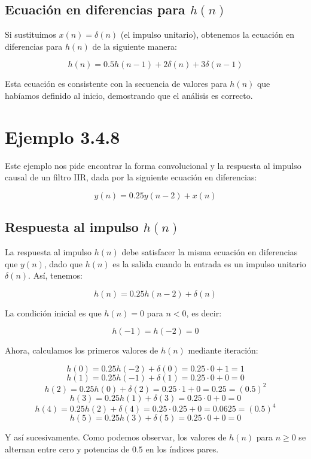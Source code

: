 \documentclass[10pt]{article}
\theoremstyle{definition}
\theoremstyle{remark}
\theoremstyle{definition}
\numberwithin{equation}{prob}
\begin{document}
\subsection*{Ecuación en diferencias para \( h(n) \)}

Si sustituimos \( x(n) = \delta(n) \) (el impulso unitario), obtenemos la ecuación en diferencias para \( h(n) \) de la siguiente manera:

\[
h(n) = 0.5 h(n-1) + 2\delta(n) + 3\delta(n-1)
\]

Esta ecuación es consistente con la secuencia de valores para \( h(n) \) que habíamos definido al inicio, demostrando que el análisis es correcto.


\section*{Ejemplo 3.4.8}

Este ejemplo nos pide encontrar la forma convolucional y la respuesta al impulso causal de un filtro IIR, dada por la siguiente ecuación en diferencias:

\[
y(n) = 0.25y(n-2) + x(n)
\]

\subsection*{Respuesta al impulso \( h(n) \)}

La respuesta al impulso \( h(n) \) debe satisfacer la misma ecuación en diferencias que \( y(n) \), dado que \( h(n) \) es la salida cuando la entrada es un impulso unitario \( \delta(n) \). Así, tenemos:

\[
h(n) = 0.25h(n-2) + \delta(n)
\]

La condición inicial es que \( h(n) = 0 \) para \( n < 0 \), es decir:

\[
h(-1) = h(-2) = 0
\]

Ahora, calculamos los primeros valores de \( h(n) \) mediante iteración:

\[
h(0) = 0.25h(-2) + \delta(0) = 0.25 \cdot 0 + 1 = 1
\]
\[
h(1) = 0.25h(-1) + \delta(1) = 0.25 \cdot 0 + 0 = 0
\]
\[
h(2) = 0.25h(0) + \delta(2) = 0.25 \cdot 1 + 0 = 0.25 = (0.5)^2
\]
\[
h(3) = 0.25h(1) + \delta(3) = 0.25 \cdot 0 + 0 = 0
\]
\[
h(4) = 0.25h(2) + \delta(4) = 0.25 \cdot 0.25 + 0 = 0.0625 = (0.5)^4
\]
\[
h(5) = 0.25h(3) + \delta(5) = 0.25 \cdot 0 + 0 = 0
\]

Y así sucesivamente. Como podemos observar, los valores de \( h(n) \) para \( n \geq 0 \) se alternan entre cero y potencias de \( 0.5 \) en los índices pares.
\end{document}
